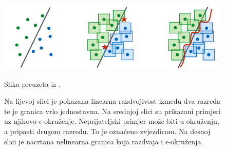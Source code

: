 \documentclass[utf8, diplomski]{fer}
\begin{document}
\begin{figure}[H]
\centering
\includegraphics[width=0.99\textwidth,keepaspectratio]{img/other/pgd_nonlinearity.png}
\caption{Na lijevoj slici je pokazana linearna razdvojivost između dva razreda te je granica vrlo jednostavna. Na srednjoj slici su prikazani primjeri uz njihovo $\epsilon$-okruženje. Neprijateljski primjer može biti u okruženju, a pripasti drugom razredu. To je označeno zvjezdicom. Na desnoj slici je nacrtana nelinearna granica koja razdvaja i $\epsilon$-okruženja.} Slika preuzeta iz \citep{Madry2017TowardsDL}.
\label{fig:pgd_nonlinearity}
\end{figure}
\end{document}
